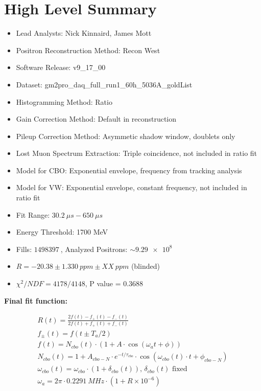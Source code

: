 \chapter*{High Level Summary}

\vspace{5mm}

\begin{itemize}
	\item{Lead Analysts: Nick Kinnaird, James Mott}
	\item{Positron Reconstruction Method: Recon West}
	\item{Software Release: v9\_17\_00}
	\item{Dataset: gm2pro\_daq\_full\_run1\_60h\_5036A\_goldList}
	\item{Histogramming Method: Ratio}
	\item{Gain Correction Method: Default in reconstruction}
	\item{Pileup Correction Method: Asymmetic shadow window, doublets only}
	\item{Lost Muon Spectrum Extraction: Triple coincidence, not included in ratio fit}
	\item{Model for CBO: Exponential envelope, frequency from tracking analysis}
	\item{Model for VW: Exponential envelope, constant frequency, not included in ratio fit}
	\item{Fit Range: $\SI{30.2}{\mu s} - \SI{650}{\mu s}$}
	\item{Energy Threshold: 1700 MeV}
	\item{Fills: $\SI{1498397}{}$, Analyzed Positrons: $\sim \SI{9.29e8}{}$}
	\item{$R = -20.38 \pm \SI{1.330}{ppm} \pm XX\SI{}{ppm}$ (blinded)}
	\item{$\chi^{2}/NDF = 4178/4148$, P value = 0.3688}
\end{itemize}

\textbf{Final fit function:}

\begin{gather*}
		R(t) = \frac{2f(t) - f_{+}(t) - f_{-}(t)}{2f(t) + f_{+}(t) + f_{-}(t)} \\[5pt]
		f_{\pm}(t) = f(t \pm T_{a}/2) \\[5pt]
		f(t) = N_{cbo}(t) \cdot (1 + A \cdot \cos(\omega_{a}t + \phi)) \\[5pt]
		N_{cbo}(t) = 1 + A_{cbo-N} \cdot e^{-t/\tau_{cbo}} \cdot \cos(\omega_{cbo}(t) \cdot t + \phi_{cbo-N}) \\[5pt]
		\omega_{cbo}(t) = \omega_{cbo} \cdot (1 + \delta_{cbo}(t)) \text{, $\delta_{cbo}(t)$ fixed} \\[5pt]
		\omega_{a} = 2 \pi \cdot \SI{0.2291}{MHz} \cdot (1 + R \times 10^{-6})
\end{gather*}

